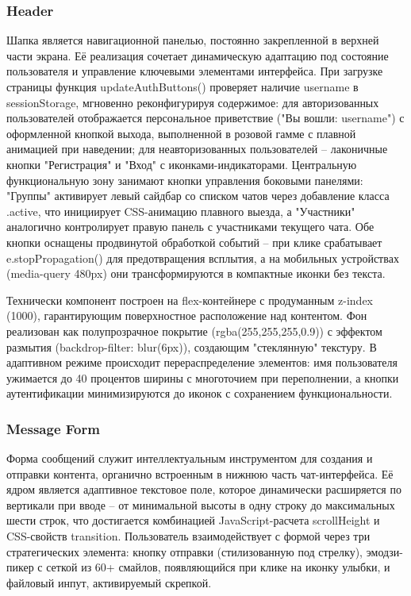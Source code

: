 \subsubsection{Header}
Шапка является навигационной панелью, постоянно закрепленной в верхней части экрана. Её реализация сочетает динамическую адаптацию под состояние пользователя и управление ключевыми элементами интерфейса. При загрузке страницы функция updateAuthButtons() проверяет наличие username в sessionStorage, мгновенно реконфигурируя содержимое: для авторизованных пользователей отображается персональное приветствие ("Вы вошли: username") с оформленной кнопкой выхода, выполненной в розовой гамме с плавной анимацией при наведении; для неавторизованных пользователей – лаконичные кнопки "Регистрация" и "Вход" с иконками-индикаторами. 
Центральную функциональную зону занимают кнопки управления боковыми панелями: "Группы" активирует левый сайдбар со списком чатов через добавление класса .active, что инициирует CSS-анимацию плавного выезда, а "Участники" аналогично контролирует правую панель с участниками текущего чата. Обе кнопки оснащены продвинутой обработкой событий – при клике срабатывает e.stopPropagation() для предотвращения всплытия, а на мобильных устройствах (media-query 480px) они трансформируются в компактные иконки без текста.

Технически компонент построен на flex-контейнере с продуманным z-index (1000), гарантирующим поверхностное расположение над контентом. Фон реализован как полупрозрачное покрытие (rgba(255,255,255,0.9)) с эффектом размытия (backdrop-filter: blur(6px)), создающим "стеклянную" текстуру. В адаптивном режиме происходит перераспределение элементов: имя пользователя ужимается до 40 процентов ширины с многоточием при переполнении, а кнопки аутентификации минимизируются до иконок с сохранением функциональности.
\subsubsection{Message Form}
Форма сообщений служит интеллектуальным инструментом для создания и отправки контента, органично встроенным в нижнюю часть чат-интерфейса. Её ядром является адаптивное текстовое поле, которое динамически расширяется по вертикали при вводе – от минимальной высоты в одну строку до максимальных шести строк, что достигается комбинацией JavaScript-расчета scrollHeight и CSS-свойств transition. Пользователь взаимодействует с формой через три стратегических элемента: кнопку отправки (стилизованную под стрелку), эмодзи-пикер с сеткой из 60+ смайлов, появляющийся при клике на иконку улыбки, и файловый инпут, активируемый скрепкой.

